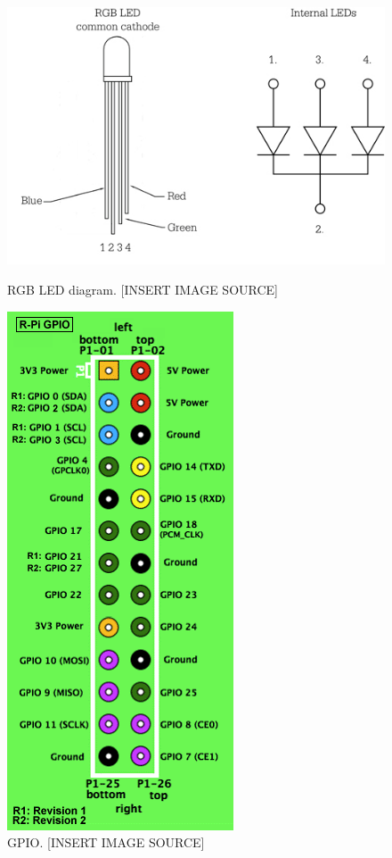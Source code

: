\begin{figure}
	\begin{minipage}[t]{0.4\linewidth}
		\centering
			\includegraphics[width=0.30\paperwidth]{Pictures/rgb_led_diagram.jpg}
		\caption{RGB LED diagram. [INSERT IMAGE SOURCE]}
		\label{fig:rgb-led}
	\end{minipage}
	\hspace{1cm}
	\begin{minipage}[t]{0.4\linewidth}
		\centering
			\includegraphics[width=0.20\paperwidth]{Pictures/GPIOs.png}
		\caption{\rpi{} GPIO. [INSERT IMAGE SOURCE]}
		\label{fig:rpigpio}
	\end{minipage}
\end{figure}

